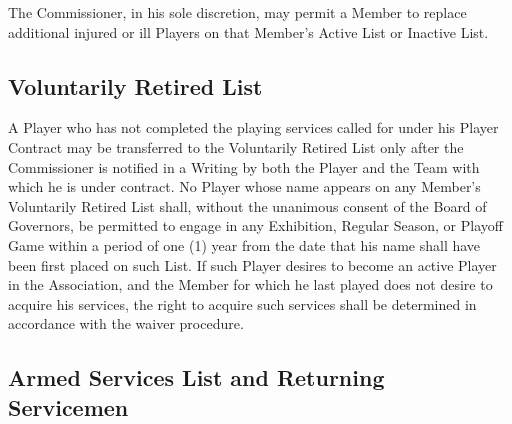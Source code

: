 \documentclass[]{book}
\theoremstyle{definition}
\theoremstyle{definition}
\theoremstyle{definition}
\theoremstyle{remark}
\begin{document}
The Commissioner, in his sole discretion, may permit a Member to replace
additional injured or ill Players on that Member's Active List or
Inactive List.

\subsection{Voluntarily Retired List}\label{voluntarily-retired-list}

A Player who has not completed the playing services called for under his
Player Contract may be transferred to the Voluntarily Retired List only
after the Commissioner is notified in a Writing by both the Player and
the Team with which he is under contract. No Player whose name appears
on any Member's Voluntarily Retired List shall, without the unanimous
consent of the Board of Governors, be permitted to engage in any
Exhibition, Regular Season, or Playoff Game within a period of one (1)
year from the date that his name shall have been first placed on such
List. If such Player desires to become an active Player in the
Association, and the Member for which he last played does not desire to
acquire his services, the right to acquire such services shall be
determined in accordance with the waiver procedure.

\subsection{Armed Services List and Returning
Servicemen}\label{armed-services-list-and-returning-servicemen}
\end{document}
